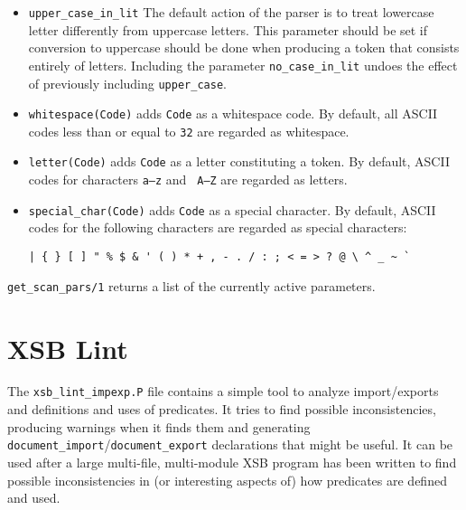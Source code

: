 \begin{description}
\begin{itemize}
\item{{\tt upper\_case\_in\_lit}} The default action of the parser is
to treat lowercase letter differently from uppercase letters.  This
parameter should be set if conversion to uppercase should be done when
producing a token that consists entirely of letters.  Including the
parameter {\tt no\_case\_in\_lit} undoes the effect of previously
including {\tt upper\_case}.

\item{{\tt whitespace(Code)}} adds {\tt Code} as a whitespace code.
By default, all ASCII codes less than or equal to {\tt 32} are
regarded as whitespace.

\item{{\tt letter(Code)}} adds {\tt Code} as a letter constituting a
token. By default, ASCII codes for characters {\tt a--z} and {\tt
A--Z} are regarded as letters.

\item{{\tt special\_char(Code)}} adds {\tt Code} as a special
  character.  By default, ASCII codes for the following characters are
  regarded as special characters:

\begin{verbatim}
| { } [ ] " % $ & ' ( ) * + , - . / : ; < = > ? @ \ ^ _ ~ `
\end{verbatim}
\end{itemize}

{\tt get\_scan\_pars/1} returns a list of the currently active
parameters.

\end{description} 

\section{XSB Lint}

The {\tt xsb\_lint\_impexp.P} file contains a simple tool to analyze
import/exports and definitions and uses of predicates.  It tries to
find possible inconsistencies, producing warnings when it finds them
and generating {\tt document\_import}/{\tt document\_export}
declarations that might be useful.  It can be used after a large
multi-file, multi-module XSB program has been written to find possible
inconsistencies in (or interesting aspects of) how predicates are
defined and used.

